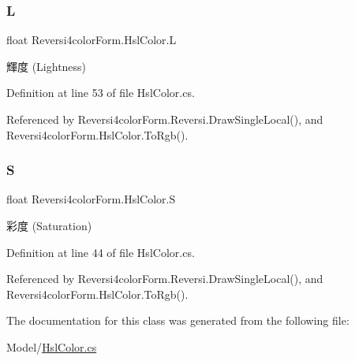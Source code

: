 \subsubsection{\texorpdfstring{L}{L}}
{\footnotesize\ttfamily float Reversi4color\+Form.\+Hsl\+Color.\+L\hspace{0.3cm}{\ttfamily [get]}}



輝度 (Lightness) 



Definition at line 53 of file Hsl\+Color.\+cs.



Referenced by Reversi4color\+Form.\+Reversi.\+Draw\+Single\+Local(), and Reversi4color\+Form.\+Hsl\+Color.\+To\+Rgb().

\mbox{\label{class_reversi4color_form_1_1_hsl_color_a6d0d1e94f3e7d2430ca58999a41ceabd}} 
\subsubsection{\texorpdfstring{S}{S}}
{\footnotesize\ttfamily float Reversi4color\+Form.\+Hsl\+Color.\+S\hspace{0.3cm}{\ttfamily [get]}}



彩度 (Saturation) 



Definition at line 44 of file Hsl\+Color.\+cs.



Referenced by Reversi4color\+Form.\+Reversi.\+Draw\+Single\+Local(), and Reversi4color\+Form.\+Hsl\+Color.\+To\+Rgb().



The documentation for this class was generated from the following file\+:\begin{DoxyCompactItemize}
\item 
Model/\hyperlink{_hsl_color_8cs}{Hsl\+Color.\+cs}\end{DoxyCompactItemize}
